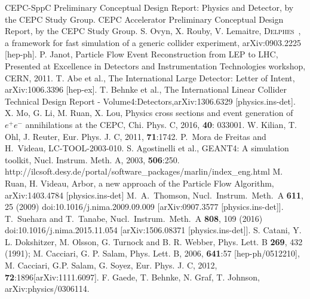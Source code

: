 \documentclass[a4paper,10pt,twoside]{cpc-hepnp}
\begin{document}
\begin{multicols}{2}
\begin{thebibliography}{90}
CEPC-SppC Preliminary Conceptual Design Report: Physics and Detector, by the CEPC Study Group.
CEPC Accelerator Preliminary Conceptual Design Report, by the CEPC Study Group.
S. Ovyn, X. Rouby,  V. Lemaitre, {\textsc{Delphes}~}, a framework for fast simulation of a generic collider experiment, arXiv:0903.2225 [hep-ph].
P. Janot, Particle Flow Event Reconstruction from LEP to LHC, Presented at Excellence in Detectors and Instrumentation Technologies workshop, CERN, 2011.
T. Abe et al., The International Large Detector: Letter of Intent, arXiv:1006.3396 [hep-ex].
T. Behnke et al., The International Linear Collider Technical Design Report - Volume4:Detectors,arXiv:1306.6329 [physics.ins-det].
X. Mo, G. Li, M. Ruan, X. Lou, Physics cross sections and event generation of $e^+e^-$ annihilations at the CEPC, Chi. Phys. C, 2016, {\bf 40}: 033001.
W. Kilian, T. Ohl, J. Reuter, Eur. Phys. J. C, 2011, {\bf 71}:1742.
  P.~Mora de Freitas and H.~Videau, LC-TOOL-2003-010.
S. Agostinelli et al., GEANT4: A simulation toolkit, Nucl. Instrum. Meth. A, 2003, {\bf 506}:250.
 http://ilcsoft.desy.de/portal/software\_packages/marlin/index\_eng.html
M. Ruan, H. Videau, Arbor, a new approach of the Particle Flow Algorithm, arXiv:1403.4784 [physics.ins-det]
  M.~A.~Thomson,
  Nucl.\ Instrum.\ Meth.\ A {\bf 611}, 25 (2009)
  doi:10.1016/j.nima.2009.09.009
  [arXiv:0907.3577 [physics.ins-det]].
  T.~Suehara and T.~Tanabe,
  Nucl.\ Instrum.\ Meth.\ A {\bf 808}, 109 (2016)
  doi:10.1016/j.nima.2015.11.054
  [arXiv:1506.08371 [physics.ins-det]].
 S. Catani, Y. L. Dokshitzer, M. Olsson, G. Turnock and B. R. Webber, Phys. Lett. B {\bf 269}, 432 (1991);
M. Cacciari, G. P. Salam, Phys. Lett. B, 2006, {\bf 641}:57 [hep-ph/0512210], M. Cacciari, G.P. Salam, G. Soyez, Eur. Phys. J. C, 2012, {\bf 72}:1896[arXiv:1111.6097].
F. Gaede, T. Behnke, N. Graf, T. Johnson, arXiv:physics/0306114.

\end{thebibliography}
\end{multicols}

\clearpage
\end{document}
